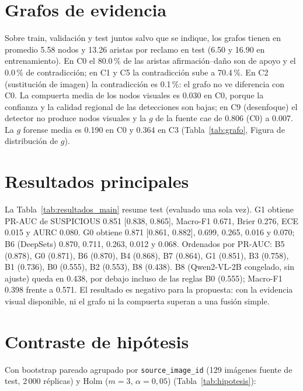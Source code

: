 \section{Grafos de evidencia}

Sobre train, validación y test juntos salvo que se indique, los grafos tienen en promedio 5.58 nodos y 13.26
aristas por reclamo en test (6.50 y 16.90 en
entrenamiento). En C0 el 80.0\,\% de las aristas afirmación--daño son de apoyo y el
0.0\,\% de contradicción; en C1 y C5 la contradicción sube a
70.4\,\%. En C2 (sustitución de imagen) la contradicción es
0.1\,\%: el grafo no ve diferencia con C0. La compuerta media de los nodos visuales
es 0.030 en C0, porque la confianza y la calidad regional de las detecciones son bajas; en C9
(desenfoque) el detector no produce nodos visuales y la $g$ de la fuente cae de 0.806 (C0) a
0.007. La $g$ forense media es 0.190 en C0 y 0.364
en C3 (Tabla~\ref{tab:grafo}, Figura de distribución de $g$).

\section{Resultados principales}

La Tabla~\ref{tab:resultados_main} resume test (evaluado una sola vez). G1 obtiene PR-AUC de SUSPICIOUS
0.851 [0.838, 0.865], Macro-F1 0.671, Brier 0.276,
ECE 0.015 y AURC 0.080. G0 obtiene 0.871 [0.861, 0.882],
0.699, 0.265, 0.016 y 0.070; B6 (DeepSets)
0.870, 0.711, 0.263, 0.012 y 0.068.
Ordenados por PR-AUC: B5 (0.878), G0 (0.871), B6 (0.870), B4 (0.868), B7 (0.864), G1 (0.851), B3 (0.758), B1 (0.736), B0 (0.555), B2 (0.553), B8 (0.438). B8 (Qwen2-VL-2B congelado, sin ajuste) queda en 0.438, por debajo
incluso de las reglas B0 (0.555); Macro-F1 0.398 frente a 0.571.
El resultado es negativo para la propuesta: con la evidencia visual disponible, ni el grafo ni la compuerta superan a una
fusión simple.

\section{Contraste de hipótesis}

Con bootstrap pareado agrupado por \texttt{source\_image\_id} (129 imágenes fuente de test, 2\,000 réplicas)
y Holm ($m=3$, $\alpha=0{,}05$) (Tabla~\ref{tab:hipotesis}):

